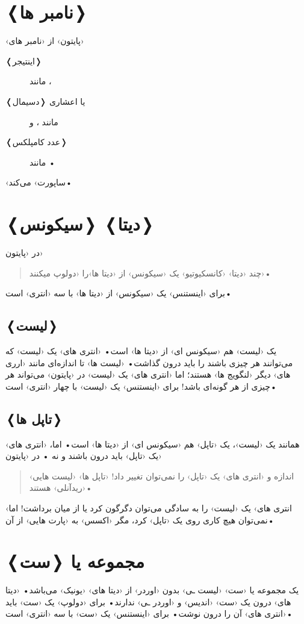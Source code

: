 \documentclass[openany, twocolumn]{book}
\begin{document}
\section{❬نامبر ها❭}
‹پایتون› از ‹نامبر های›
\begin{description}
\item [{❬اینتیجر❭}] مانند ،
\item [{❬دسیمال❭ یا اعشاری}] مانند ، و
\item [{❬عدد کامپلکس❭}] مانند •
\end{description}
‹ساپورت› می‌کند•

\section{❬سیکونس❭ ❬دیتا❭}
در ‹پایتون›
\begin{quotation}
چند ‹دیتا› ‹کانسکیوتیو› یک ‹سیکونس› از ‹دیتا ها›را ‹دولوپ میکنند›•
\end{quotation}
برای ‹اینستنس›  یک ‹سیکونس› از ‹دیتا ها› با سه ‹انتری› است•

\subsection{❬لیست❭}
یک ‹لیست› هم ‹سیکونس ای› از ‹دیتا ها› است• ‹انتری های› یک ‹لیست› که می‌توانند هر چیزی باشند را باید درون \code{[]} گذاشت• ‹لیست ها› تا اندازه‌ای مانند ‹ارری های› دیگر ‹لنگویج ها› هستند؛ اما ‹انتری های› یک ‹لیست› در ‹پایتون› می‌تواند هر چیزی از هر گونه‌ای باشد! برای ‹اینستنس› \code{[2, "a", 3.14, print]} یک ‹لیست› با چهار ‹انتری› است•

\subsection{❬تاپل ها❭}
همانند یک ‹لیست›، یک ‹تاپل› هم ‹سیکونس ای› از ‹دیتا ها› است• اما، ‹انتری های› یک ‹تاپل› باید درون \code{()} باشند و نه \code{[]}• در ‹پایتون›
\begin{quotation}
اندازه و ‹انتری های› یک ‹تاپل› را نمی‌توان تغییر داد! ‹تاپل ها› ‹لیست هایی› ‹ریدآنلی› هستند•
\end{quotation}
‹انتری های› یک ‹لیست› را به سادگی می‌توان دگرگون کرد یا از میان برداشت! اما نمی‌توان هیچ کاری روی یک ‹تاپل› کرد، مگر ‹اکسس› به ‹پارت هایی› از آن•

\section{مجموعه یا ❬ست❭}
یک مجموعه یا ‹ست› ‹لیست ـی› بدون ‹اوردر› از ‹دیتا های› ‹یونیک› می‌باشد• ‹دیتا های› درون یک ‹ست› ‹اندیس› و ‹اوردر ـی› ندارند• برای ‹دولوپ› یک ‹ست› باید ‹انتری های› آن را درون \code{\{\}} نوشت• برای ‹اینستنس›  یک ‹ست› با سه ‹انتری› است•
\end{document}
